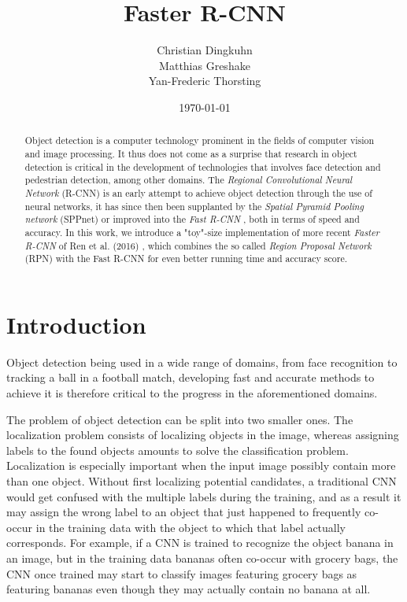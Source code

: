 \documentclass[a4paper]{article}
\title{Faster R-CNN}
\author{Christian Dingkuhn\\Matthias Greshake\\Yan-Frederic Thorsting}
\date{\today}
\begin{document}
\maketitle

\begin{abstract}
Object detection is a computer technology prominent in the fields of computer vision and image processing. It thus does not come as a surprise that research in object detection is critical in the development of technologies that involves face detection and pedestrian detection, among other domains. The \emph{Regional Convolutional Neural Network} (R-CNN) \cite{rcnn} is an early attempt to achieve object detection through the use of neural networks, it has since then been supplanted by the \emph{Spatial Pyramid Pooling network} (SPPnet) \cite{sppnet} or improved into the \emph{Fast R-CNN} \cite{fastrcnn}, both in terms of speed and accuracy. In this work, we introduce a "toy"-size implementation of more recent \emph{Faster R-CNN} of Ren et al. (2016) \cite{fasterrcnn}, which combines the so called \emph{Region Proposal Network} (RPN) \cite{fasterrcnn} with the Fast R-CNN for even better running time and accuracy score.
\end{abstract}

\section{Introduction}

Object detection being used in a wide range of domains, from face recognition to tracking a ball in a football match, developing fast and accurate methods to achieve it is therefore critical to the progress in the aforementioned domains.

The problem of object detection can be split into two smaller ones. The localization problem consists of localizing objects in the image, whereas assigning labels to the found objects amounts to solve the classification problem. Localization is especially important when the input image possibly contain more than one object. Without first localizing potential candidates, a traditional CNN would get confused with the multiple labels during the training, and as a result it may assign the wrong label to an object that just happened to frequently co-occur in the training data with the object to which that label actually corresponds. For example,  if a CNN is trained to recognize the object banana in an image, but in the training data bananas often co-occur with grocery bags, the CNN once trained may start to classify images featuring grocery bags as featuring bananas even though they may actually contain no banana at all.
\end{document}
